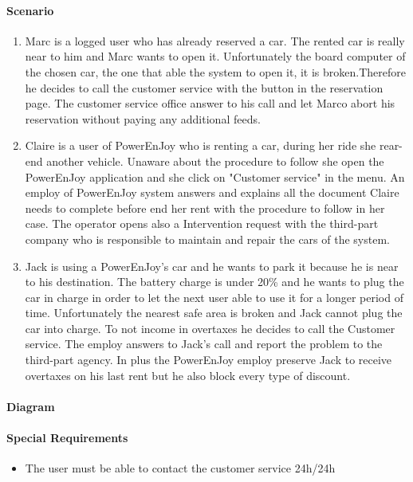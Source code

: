 \paragraph{Scenario}
\begin{enumerate}
	\item Marc is a logged user who has already reserved a car. The rented car is really near to him and Marc wants to open it. Unfortunately the board computer of the chosen car, the one that able the system to open it, it is broken.Therefore he decides to call the customer service with the button in the reservation page. The customer service office answer to his call and let Marco abort his reservation without paying any additional feeds.
	\item Claire is a user of PowerEnJoy who is renting a car, during her ride she rear-end another vehicle. Unaware about the procedure to follow she open the PowerEnJoy application and she click on "Customer service" in the menu. An employ of PowerEnJoy system answers and explains all the document Claire needs to complete before end her rent with the procedure to follow in her case. The operator opens also a Intervention request with the third-part company who is responsible to maintain and repair the cars of the system.
	\item Jack is using a PowerEnJoy's car and he wants to park it because he is near to his destination. The battery charge is under 20\% and he wants to plug the car in charge in order to let the next user able to use it for a longer period of time. Unfortunately the nearest safe area is broken and Jack cannot plug the car into charge. To not income in overtaxes he decides to call the Customer service. The employ answers to Jack's call and report the problem to the third-part agency. In plus the PowerEnJoy employ preserve Jack to receive overtaxes on his last rent but he also block every type of discount.
\end{enumerate}
\paragraph{Diagram}
\paragraph {Special Requirements}
\begin{itemize}
	\item The user must be able to contact the customer service 24h/24h
\end{itemize}

